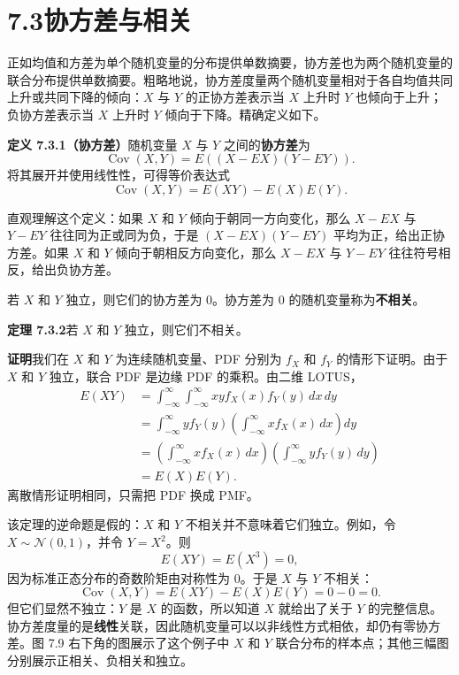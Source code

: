 \documentclass[UTF8,12pt,a4paper,fontset=fandol]{ctexart}
\begin{document}
\section*{7.3\quad 协方差与相关}

正如均值和方差为单个随机变量的分布提供单数摘要，协方差也为两个随机变量的联合分布提供单数摘要。粗略地说，协方差度量两个随机变量相对于各自均值共同上升或共同下降的倾向：$X$ 与 $Y$ 的正协方差表示当 $X$ 上升时 $Y$ 也倾向于上升；负协方差表示当 $X$ 上升时 $Y$ 倾向于下降。精确定义如下。

\noindent\textbf{定义 7.3.1（协方差）}\quad 随机变量 $X$ 与 $Y$ 之间的\textbf{协方差}为
\[
  \operatorname{Cov}(X,Y)=E((X-EX)(Y-EY)).
\]
将其展开并使用线性性，可得等价表达式
\[
  \operatorname{Cov}(X,Y)=E(XY)-E(X)E(Y).
\]

直观理解这个定义：如果 $X$ 和 $Y$ 倾向于朝同一方向变化，那么 $X-EX$ 与 $Y-EY$ 往往同为正或同为负，于是 $(X-EX)(Y-EY)$ 平均为正，给出正协方差。如果 $X$ 和 $Y$ 倾向于朝相反方向变化，那么 $X-EX$ 与 $Y-EY$ 往往符号相反，给出负协方差。

若 $X$ 和 $Y$ 独立，则它们的协方差为 $0$。协方差为 $0$ 的随机变量称为\textbf{不相关}。

\noindent\textbf{定理 7.3.2}\quad 若 $X$ 和 $Y$ 独立，则它们不相关。

\noindent\textbf{证明}\quad 我们在 $X$ 和 $Y$ 为连续随机变量、PDF 分别为 $f_X$ 和 $f_Y$ 的情形下证明。由于 $X$ 和 $Y$ 独立，联合 PDF 是边缘 PDF 的乘积。由二维 LOTUS，
\[
\begin{aligned}
  E(XY)
  &=\int_{-\infty}^{\infty}\int_{-\infty}^{\infty}
  xy f_X(x)f_Y(y)\,dx\,dy\\
  &=\int_{-\infty}^{\infty} y f_Y(y)
    \left(\int_{-\infty}^{\infty}x f_X(x)\,dx\right)dy\\
  &=\left(\int_{-\infty}^{\infty}x f_X(x)\,dx\right)
    \left(\int_{-\infty}^{\infty}y f_Y(y)\,dy\right)\\
  &=E(X)E(Y).
\end{aligned}
\]
离散情形证明相同，只需把 PDF 换成 PMF。

该定理的逆命题是假的：$X$ 和 $Y$ 不相关并不意味着它们独立。例如，令 $X\sim \mathcal{N}(0,1)$，并令 $Y=X^2$。则
\[
  E(XY)=E(X^3)=0,
\]
因为标准正态分布的奇数阶矩由对称性为 $0$。于是 $X$ 与 $Y$ 不相关：
\[
  \operatorname{Cov}(X,Y)=E(XY)-E(X)E(Y)=0-0=0.
\]
但它们显然不独立：$Y$ 是 $X$ 的函数，所以知道 $X$ 就给出了关于 $Y$ 的完整信息。协方差度量的是\textbf{线性}关联，因此随机变量可以以非线性方式相依，却仍有零协方差。图 7.9 右下角的图展示了这个例子中 $X$ 和 $Y$ 联合分布的样本点；其他三幅图分别展示正相关、负相关和独立。
\end{document}
